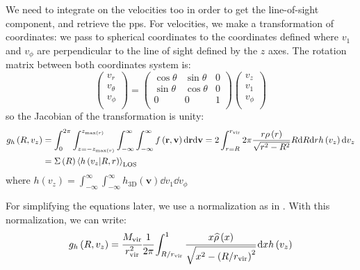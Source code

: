 We need to integrate on the velocities too in order to get the line-of-sight
component, and retrieve the pps. For velocities, we make a transformation of
coordinates: we pass to spherical coordinates to the coordinates defined where
$v_1$ and $v_\phi$ are perpendicular to the line of sight defined by the $z$
axes. The rotation matrix between both coordinates system is:
%
\begin{equation}
    \begin{pmatrix}
        v_r \\
        v_\theta \\
        v_\phi \\
    \end{pmatrix}
    =
    \begin{pmatrix}
        \cos\theta & \sin\theta & 0 \\
        \sin\theta & \cos\theta & 0 \\
        0 & 0 & 1 \\
    \end{pmatrix}
    \begin{pmatrix}
        v_z \\
        v_1 \\
        v_\phi \\
    \end{pmatrix}
\end{equation}
%
so the Jacobian of the transformation is unity:
%
\begin{align}
    \label{eq:intintfunc}
    g_h \left(R, v_z\right) &=
    \int_0^{2\pi}\int_{z=-z_{\max\left(r\right)}}^{z_{\max\left(r\right)}}
    \int_{-\infty}^\infty\int_{-\infty}^\infty
    f\left(\textbf{r},\textbf{v}\right){\rm{d}}\textbf{r}{\rm{d}}\textbf{v}=
    2\int_{r=R}^{r_{\mathrm{vir}}}2\pi
    \frac{r\rho\left(r\right)}{\sqrt{r^2-R^2}}R{\rm{d}}{R}{\rm{d}}{r}
    h\left(v_z\right){\rm{d}}{v_z} \notag\\
    &= \Sigma \left(R\right) {\left< h \left(v_z|R, r\right)
    \right>}_\mathrm{LOS}
\end{align}
%
where $h \left(v_z\right) = \int_{-\infty}^\infty\int_{-\infty}^\infty
h_\mathrm{3D} \left(\textbf{v}\right)\dd v_1 \dd v_\phi$

For simplifying the equations later, we use a normalization as in
. With this normalization, we can write:
%
\begin{equation}
    g_h \left(R, v_z\right) =\cfrac{M_{\rm vir}}{r_{\rm vir}^2}
    \cfrac{1}{2\pi}
    \int_{R/r_{\rm vir}}^1
    \cfrac{x\widehat\rho \left(x\right)}{\sqrt{x^2 -
    {\left(R/r_{\rm vir}\right)}^2}}\,{\rm{d}} x h \left(v_z\right)
\end{equation}

